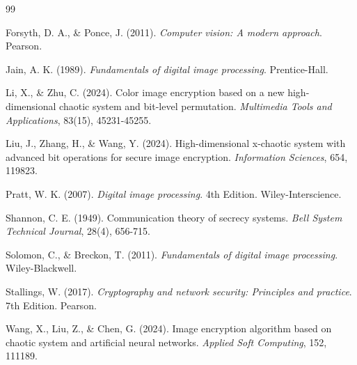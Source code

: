 \begin{thebibliography}{99}
\begin{LTRbibitems}
 Forsyth, D. A., \& Ponce, J. (2011). \textit{Computer vision: A modern approach}. Pearson.
\end{LTRbibitems}

\begin{LTRbibitems}
 Jain, A. K. (1989). \textit{Fundamentals of digital image processing}. Prentice-Hall.
\end{LTRbibitems}

\begin{LTRbibitems}
 Li, X., \& Zhu, C. (2024). Color image encryption based on a new high-dimensional chaotic system and bit-level permutation. \textit{Multimedia Tools and Applications}, 83(15), 45231-45255.
\end{LTRbibitems}

\begin{LTRbibitems}
 Liu, J., Zhang, H., \& Wang, Y. (2024). High-dimensional x-chaotic system with advanced bit operations for secure image encryption. \textit{Information Sciences}, 654, 119823.
\end{LTRbibitems}

\begin{LTRbibitems}
 Pratt, W. K. (2007). \textit{Digital image processing}. 4th Edition. Wiley-Interscience.
\end{LTRbibitems}

\begin{LTRbibitems}
 Shannon, C. E. (1949). Communication theory of secrecy systems. \textit{Bell System Technical Journal}, 28(4), 656-715.
\end{LTRbibitems}

\begin{LTRbibitems}
 Solomon, C., \& Breckon, T. (2011). \textit{Fundamentals of digital image processing}. Wiley-Blackwell.
\end{LTRbibitems}

\begin{LTRbibitems}
 Stallings, W. (2017). \textit{Cryptography and network security: Principles and practice}. 7th Edition. Pearson.
\end{LTRbibitems}

\begin{LTRbibitems}
 Wang, X., Liu, Z., \& Chen, G. (2024). Image encryption algorithm based on chaotic system and artificial neural networks. \textit{Applied Soft Computing}, 152, 111189.
\end{LTRbibitems}


\end{thebibliography}
